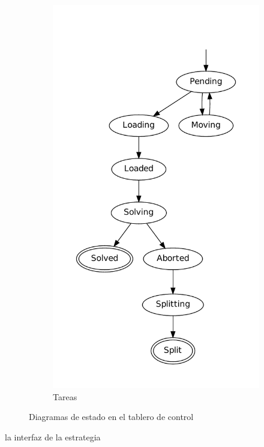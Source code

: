 \begin{figure}[h!]
\begin{subfigure}[b]{0.35\textwidth}
		\includegraphics[scale=0.3]{graphs/taskstates}
		\caption{Tareas}
	\end{subfigure}
	\caption{Diagramas de estado en el tablero de control}
\end{figure}

la interfaz de la estrategia


